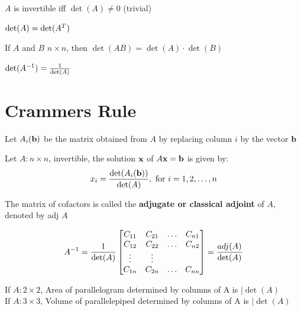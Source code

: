 \documentclass{report}
\begin{document}
\begin{theorem}
    $A$ is invertible iff $\det(A) \ne 0$ (trivial)
\end{theorem}

\begin{theorem}
    $\det(A) = \det(A^{T})$
\end{theorem}

\begin{theorem}
    If $A$ and $B$ $n \times n$, then $\det(AB) = \det(A) \cdot \det(B)$
\end{theorem}

\begin{lemma}
    $\det(A^{-1}) = \frac{1}{\det(A)}$
\end{lemma}

\section{Crammers Rule}
Let $A_i(\mathbf{b})$ be the matrix obtained from $A$ by replacing column $i$ by the vector $\mathbf{b}$

\begin{theorem}
    Let $A: n \times n$, invertible, the solution $\mathbf{x}$ of $A\mathbf{x} = \mathbf{b}$ is given by: \[
    x_i = \frac{\det(A_i(\mathbf{b}))}{\det(A)}, \text{   for }i = 1, 2, \ldots, n
    \]
\end{theorem}

The matrix of cofactors is called the \textbf{adjugate or classical adjoint} of $A$,
denoted by adj $A$

\begin{theorem}
    \[
    A^{-1} = \frac{1}{\det(A)}\begin{bmatrix}
        C_{11} & C_{21} &\ldots & C_{n1} \\
        C_{12} & C_{22} &\ldots & C_{n2} \\
        \vdots & \vdots & \\
        C_{1n} & C_{2n} &\ldots & C_{nn} \\
    \end{bmatrix} = \frac{adj(A)}{\det(A)}
    \]
\end{theorem}

\begin{theorem}
    If $A: 2 \times 2$, Area of parallelogram determined by columns of A is $|\det(A)$\\
    If $A: 3 \times 3$, Volume of parallelepiped determined by columns of A is $|\det(A)$\\
\end{theorem}
\end{document}
